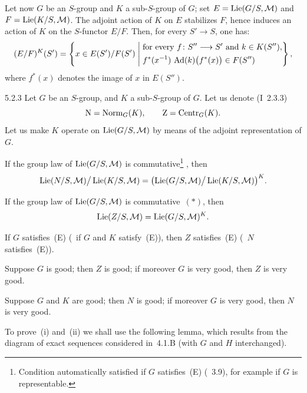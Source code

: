 Let now \(G\) be an \(S\)-group and \(K\) a sub-\(S\)-group of \(G\); set
\(E=\operatorname{Lie}(G/S,\mathcal{M})\) and \(F=\operatorname{Lie}(K/S,\mathcal{M})\). The adjoint
action of \(K\) on \(E\) stabilizes \(F\), hence induces an action of \(K\)
on the \(S\)-functor \(E/F\). Then, for every \(S'\to S\), one has:
\[
(E/F)^K(S')
=
\left\{
x\in E(S')/F(S')
\;\middle|\;
\begin{aligned}
&\text{for every }f\colon S''\longrightarrow S'\text{ and }k\in K(S''),\\
&f^*(x^{-1})\,\operatorname{Ad}(k)\bigl(f^*(x)\bigr)\in F(S'')
\end{aligned}
\right\},
\]
where \(f^*(x)\) denotes the image of \(x\) in \(E(S'')\).

\begin{theorem}{5.2.3}
\label{II.5.2.3}
Let \(G\) be an \(S\)-group, and \(K\) a sub-\(S\)-group of \(G\). Let us denote
(I~2.3.3)
\[
\mathrm{N}=\operatorname{Norm}_G(K),
\qquad
\mathrm{Z}=\operatorname{Centr}_G(K).
\]
Let us make \(K\) operate on \(\operatorname{Lie}(G/S,\mathcal{M})\) by means of the adjoint
representation of \(G\).
\begin{enumeratei}
\item If the group law of \(\operatorname{Lie}(G/S,\mathcal{M})\) is
commutative{\renewcommand{\thefootnote}{(*)}\footnote{Condition
automatically satisfied if \(G\) satisfies~(E) (\cf~3.9), for example if
\(G\) is representable.}}%
{\renewcommand{\thefootnote}{(96)}},
then
\[
\operatorname{Lie}(N/S,\mathcal{M})\big/\operatorname{Lie}(K/S,\mathcal{M})
=
\bigl(\operatorname{Lie}(G/S,\mathcal{M})\big/\operatorname{Lie}(K/S,\mathcal{M})\bigr)^{K}.
\]
\item If the group law of \(\operatorname{Lie}(G/S,\mathcal{M})\) is commutative~\((*)\),
then
\[
\operatorname{Lie}(Z/S,\mathcal{M})=\operatorname{Lie}(G/S,\mathcal{M})^{K}.
\]
\item If \(G\) satisfies~(E) (\resp\ if \(G\) and \(K\) satisfy~(E)), then
\(Z\) satisfies~(E) (\resp~\(N\) satisfies~(E)).
\item Suppose \(G\) is good; then \(Z\) is good; if moreover \(G\) is very
good, then \(Z\) is very good.
\item Suppose \(G\) and \(K\) are good; then \(N\) is good; if moreover \(G\)
is very good, then \(N\) is very good.
\end{enumeratei}
\end{theorem}

To prove~(i) and~(ii)%
{\renewcommand{\thefootnote}{(97)}}
we shall use the following lemma, which results from the diagram of exact
sequences considered in~4.1.B (with \(G\) and \(H\) interchanged).

